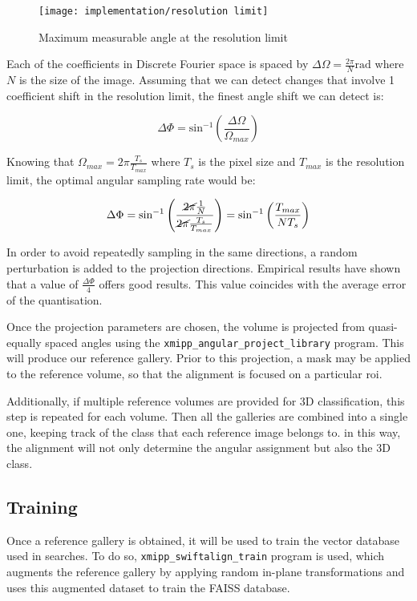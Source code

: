 \documentclass[../main.tex]{subfiles}
\begin{document}
\begin{figure}
    \centering
    \texttt{[image: implementation/resolution limit]}
    \caption{Maximum measurable angle at the resolution limit}
    \label{fig:4:resolution_limit}
\end{figure}

Each of the coefficients in Discrete Fourier space is spaced by $\Delta\Omega = \frac{2 \pi}{N} \si{\radian}$ where $N$ is the size of the image. Assuming that we can detect changes that involve 1 coefficient shift in the resolution limit, the finest angle shift we can detect is:

\begin{equation}
    \Delta\Phi = \text{sin}^{-1} \left( \frac{\Delta\Omega}{\Omega_{max}} \right)
\end{equation}

Knowing that $\Omega_{max} = 2 \pi \frac{T_s}{T_{max}}$ where $T_s$ is the pixel size and $T_{max}$ is the resolution limit, the optimal angular sampling rate would be:

\begin{equation}
    \Delta\Phi = 
    \text{sin}^{-1} \left( \frac{\cancel{2 \pi} \frac{1}{N}}{\cancel{2 \pi} \frac{T_s}{T_{max}}} \right) =
    \text{sin}^{-1} \left( \frac{T_{max}}{N T_s} \right)
\end{equation}

In order to avoid repeatedly sampling in the same directions, a random perturbation is added to the projection directions. Empirical results have shown that a value of $\frac{\Delta\Phi}{4}$ offers good results. This value coincides with the average error of the quantisation.

Once the projection parameters are chosen, the volume is projected from quasi-equally spaced angles using the \texttt{xmipp\_angular\_project\_library} program. This will produce our reference gallery. Prior to this projection, a mask may be applied to the reference volume, so that the alignment is focused on a particular \gls{roi}. 

Additionally, if multiple reference volumes are provided for 3D classification, this step is repeated for each volume. Then all the galleries are combined into a single one, keeping track of the class that each reference image belongs to. in this way, the alignment will not only determine the angular assignment but also the 3D class.

\subsection{Training}
Once a reference gallery is obtained, it will be used to train the vector database used in searches. To do so, \texttt{xmipp\_swiftalign\_train} program is used, which augments the reference gallery by applying random in-plane transformations and uses this augmented dataset to train the FAISS database. 
\end{document}

